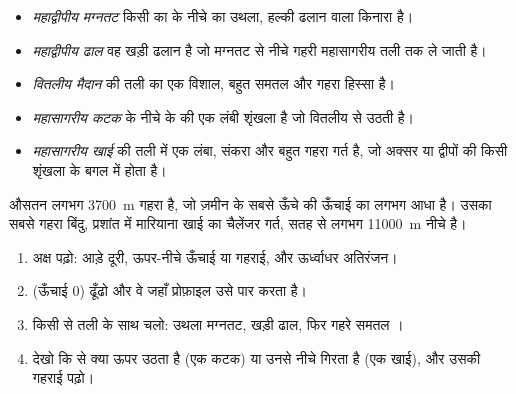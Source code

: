 \begin{definition}[महासागर की तली के हिस्से]\label{def:g8:the-oceans:seafloor}
\begin{itemize}
  \item \emph{महाद्वीपीय मग्नतट} किसी  का  के
        नीचे का उथला, हल्की ढलान वाला किनारा है।
  \item \emph{महाद्वीपीय ढाल} वह खड़ी ढलान है जो मग्नतट से
        नीचे गहरी महासागरीय तली तक ले जाती है।
  \item \emph{वितलीय मैदान}  की तली का एक विशाल, बहुत
        समतल और गहरा हिस्सा है।
  \item \emph{महासागरीय कटक}  के नीचे के  की एक
        लंबी शृंखला है जो वितलीय  से उठती है।
  \item \emph{महासागरीय खाई}  की तली में एक लंबा, संकरा
        और बहुत गहरा गर्त है, जो अक्सर  या  द्वीपों की किसी शृंखला के
        बगल में होता है।
\end{itemize}
\end{definition}

 औसतन लगभग \qty{3700}{m} गहरा है, जो ज़मीन के सबसे ऊँचे  की ऊँचाई का
लगभग आधा है। उसका सबसे गहरा बिंदु, प्रशांत  में मारियाना खाई का चैलेंजर गर्त,
सतह से लगभग \qty{11000}{m} नीचे
है।


\begin{method}[महासागर की तली का प्रोफ़ाइल पढ़ना]
\begin{enumerate}
  \item अक्ष पढ़ो: आड़े दूरी, ऊपर-नीचे ऊँचाई या गहराई, और ऊर्ध्वाधर
        अतिरंजन।
  \item {} (ऊँचाई 0) ढूँढो और वे  जहाँ प्रोफ़ाइल उसे पार करता
        है।
  \item किसी  से तली के साथ चलो: उथला मग्नतट, खड़ी ढाल, फिर गहरे समतल
        ।
  \item देखो कि  से क्या ऊपर उठता है (एक कटक) या उनसे नीचे गिरता है (एक
        खाई), और उसकी गहराई पढ़ो।
\end{enumerate}
\end{method}

